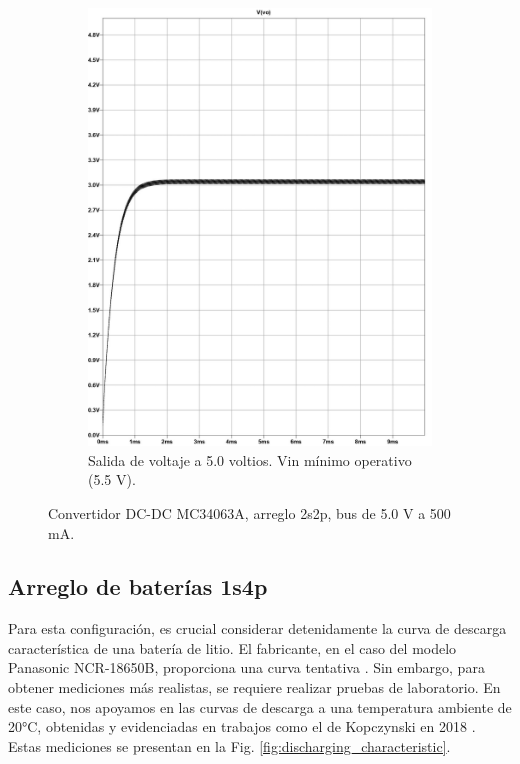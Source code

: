 \begin{figure}[h]
\begin{subfigure}{0.48\linewidth}
    \includegraphics[width=\textwidth]{Pictures/Convertidor DC-DC MC34063A, 2s2p, bus 5.0 v a 500 mA_page-0001 Min.jpg}
    \caption{Salida de voltaje a 5.0 voltios. Vin mínimo operativo (5.5 V).}
    \label{fig:2s2p_50v_2dcdcconverters_min}
  \end{subfigure}
  \caption{Convertidor DC-DC MC34063A, arreglo 2s2p, bus de 5.0 V a 500 mA.}
  \label{fig:arreglo2s2p5vdc}
\end{figure}







\subsection{Arreglo de baterías 1s4p}

Para esta configuración, es crucial considerar detenidamente la curva de descarga característica de una batería de litio. El fabricante, en el caso del modelo Panasonic NCR-18650B, proporciona una curva tentativa \cite{panasonic_18650b}. Sin embargo, para obtener mediciones más realistas, se requiere realizar pruebas de laboratorio. En este caso, nos apoyamos en las curvas de descarga a una temperatura ambiente de 20°C, obtenidas y evidenciadas en trabajos como el de Kopczynski en 2018 \cite{Kopczynski2018}. Estas mediciones se presentan en la Fig. \ref{fig:discharging_characteristic}.


